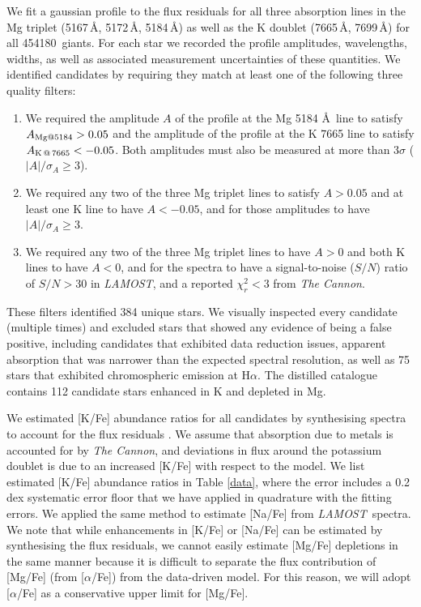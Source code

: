 \documentclass[a4paper,fleqn,usenatbib]{mnras}
\newcommand{\LamostGiants}{454180}
\newcommand{\project}[1]{\emph{#1}}
\newcommand{\lamost}{\project{LAMOST}}
\newcommand{\tc}{\project{The Cannon}}
\begin{document}
We fit a gaussian profile to the flux residuals for all three absorption lines in the Mg triplet (5167\,\AA, 5172\,\AA, 5184\,\AA) as well as the K doublet (7665\,\AA, 7699\,\AA) for all \LamostGiants\ giants. For each star we recorded the profile amplitudes, wavelengths, widths, as well as associated measurement uncertainties of these quantities. We identified candidates by requiring they match at least one of the following three quality filters:
\begin{enumerate}
\item We required the amplitude $A$ of the profile at the Mg 5184 \AA \ line to satisfy $A_{{\rm Mg} @ 5184} > 0.05$ and the amplitude of the profile at the K 7665 line to satisfy $A_{{\rm K}\,@\,7665} < -0.05$. Both amplitudes must also be measured at more than $3\sigma$ ($|A|/\sigma_{A} \geq 3$).
\item We required any two of the three Mg triplet lines to satisfy $A > 0.05$ and at least one K line to have $A < -0.05$, and for those amplitudes to have $|A|/\sigma_{A} \geq 3$.
\item We required any two of the three Mg triplet lines to have $A > 0$ and both K lines to have $A < 0$, and for the spectra to have a signal-to-noise ($S/N$) ratio of $S/N > 30$ in \lamost, and a reported $\chi_{r}^2 < 3$ from \tc.
\end{enumerate} 
 
These filters identified 384 unique stars. We visually inspected every candidate (multiple times) and excluded stars that showed any evidence of being a false positive, including candidates that exhibited data reduction issues, apparent absorption that was narrower than the expected spectral resolution, as well as 75 stars that exhibited chromospheric emission at H$\alpha$. The distilled catalogue contains 112 candidate stars enhanced in K and depleted in Mg.

We estimated [K/Fe] abundance ratios for all candidates by synthesising spectra to account for the flux residuals \citep{marcs,sme,vald,ispec}. We assume that absorption due to metals is accounted for by \tc, and deviations in flux around the potassium doublet is due to an increased [K/Fe] with respect to the model. We list estimated [K/Fe] abundance ratios in Table \ref{data}, where the error includes a 0.2\,dex systematic error floor that we have applied in quadrature with the fitting errors. We applied the same method to estimate [Na/Fe] from \lamost\ spectra. We note that while enhancements in [K/Fe] or [Na/Fe] can be estimated by synthesising the flux residuals, we cannot easily estimate [Mg/Fe] depletions in the same manner because it is difficult to separate the flux contribution of [Mg/Fe] (from [$\alpha$/Fe]) from the data-driven model. For this reason, we will adopt [$\alpha$/Fe] as a conservative upper limit for [Mg/Fe].
\end{document}
